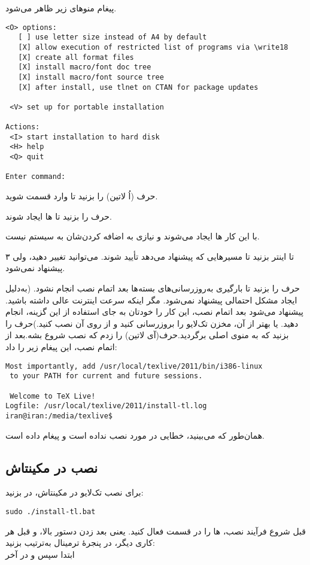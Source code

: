 پیغام منوهای زیر ظاهر می‌شود.
\begin{latin}
\begin{lstlisting}[style=Mybash]
<O> options:‬
‪   [ ] use letter size instead of A4 by default‬
‪   [X] allow execution of restricted list of programs via \write18‬
‪   [X] create all format files‬
‪   [X] install macro/font doc tree‬
‪   [X] install macro/font source tree‬
‪   [X] after install, use tlnet on CTAN for package updates
 
‪ <V> set up for portable installation‬
 
‪Actions:‬
‪ <I> start installation to hard disk‬
‪ <H> help‬
‪ <Q> quit‬
 
‪Enter command:
\end{lstlisting}
\end{latin}
حرف
 (اُ لاتین) را بزنید تا وارد قسمت 
 شوید.

حرف
 را بزنید تا 
ها ایجاد شوند.

با این کار 
ها ایجاد می‌شوند و نیازی به اضافه کردن‌شان به 
 سیستم نیست.

۳ تا اینتر بزنید تا مسیرهایی که پیشنهاد می‌دهد تأیید شوند. می‌توانید تغییر دهید، ولی پیشنهاد نمی‌شود.

حرف
 را بزنید تا بارگیری به‌روزرسانی‌های بسته‌ها بعد اتمام نصب انجام نشود. (به‌دلیل ایجاد مشکل احتمالی پیشنهاد نمی‌شود. مگر اینکه سرعت اینترنت عالی داشته باشید. پیشنهاد می‌شود بعد اتمام نصب، این کار را خودتان به جای استفاده از این گزینه، انجام دهید. یا بهتر از آن، مخزن تک‌لایو را بروزرسانی کنید و از روی آن نصب کنید.)حرف را بزنید که به منوی اصلی برگردید.حرف(آی لاتین) را زدم که نصب شروع بشه.بعد از اتمام نصب، این پیغام زیر را داد:
\begin{latin}
\begin{lstlisting}[style=Mybash]
Most importantly, add /usr/local/texlive/2011/bin/i386-linux
 to your PATH for current and future sessions.
 
 Welcome to TeX Live!
Logfile: /usr/local/texlive/2011/install-tl.log
iran@iran:/media/texlive$
\end{lstlisting}
\end{latin}
همان‌طور که می‌بینید، خطایی در مورد نصب نداده است و پیغام 
 داده است.
\subsection{نصب در مکینتاش}
برای نصب تک‌لایو در مکینتاش، در
 بزنید:
\begin{latin}
\begin{lstlisting}[style=Mybash]
sudo ./install-tl.bat
\end{lstlisting}
\end{latin}
قبل شروع فرآیند نصب،
 ها را در قسمت 
 فعال کنید. یعنی بعد زدن دستور بالا، و قبل هر کاری دیگر، در پنجرهٔ ترمینال به‌ترتیب بزنید:\\
ابتدا  سپس  و در آخر 
